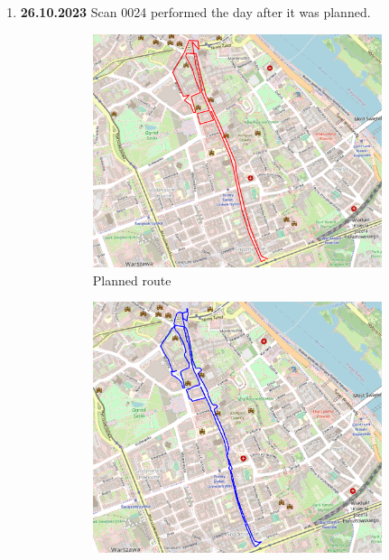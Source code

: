 \documentclass[a4paper,12pt]{article}
\begin{document}
\begin{enumerate}
	\item \textbf{26.10.2023} Scan 0024 performed the day after it was planned.
	\begin{figure}[H]
		\centering
		\begin{subfigure}{.80\textwidth}
			\centering
			\includegraphics[width=1\linewidth]{route_p24}
			\caption{Planned route}
			\label{fig:a24}
		\end{subfigure}%
		\linebreak
		\begin{subfigure}{.80\textwidth}
			\centering
			\includegraphics[width=1\linewidth]{route_c24}

\end{subfigure}
\end{figure}
\end{enumerate}
\end{document}
